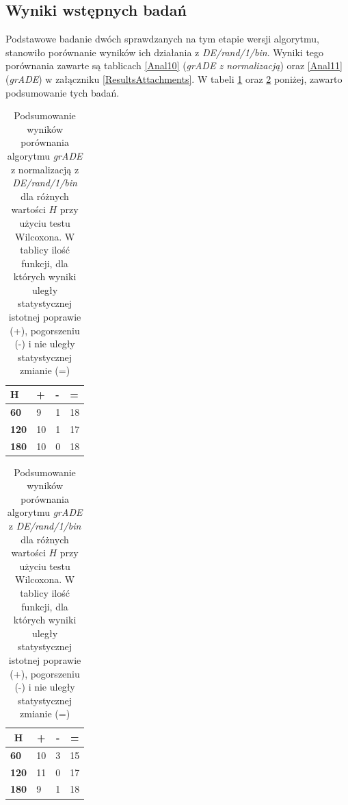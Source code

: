 \documentclass[12pt,a4paper]{report}
\begin{document}
{{{{{{{\subsection{Wyniki wstępnych badań}
\par{
Podstawowe badanie dwóch sprawdzanych na tym etapie wersji algorytmu, stanowiło porównanie wyników ich działania z \emph{DE/rand/1/bin}. Wyniki tego porównania zawarte są tablicach \ref{Anal10} (\emph{grADE z normalizacją}) oraz \ref{Anal11} (\emph{grADE}) w załączniku \ref{ResultsAttachments}. W tabeli \ref{Anal10Sum} oraz \ref{Anal11Sum} poniżej, zawarto podsumowanie tych badań.
}
\begin{table}[h]
\centering
\caption{Podsumowanie wyników porównania algorytmu \emph{grADE} z normalizacją z \emph{DE/rand/1/bin} dla różnych wartości $H$ przy użyciu testu Wilcoxona. W tablicy ilość funkcji, dla których wyniki uległy statystycznej istotnej poprawie (+), pogorszeniu (-) i nie uległy statystycznej zmianie (=)}
\label{Anal10Sum}
\begin{tabular}{|l|l|l|l|}
\hline
{\bf H}   & +  & - & =  \\ \hline
{\bf 60}  & 9  & 1 & 18 \\ \hline
{\bf 120} & 10 & 1 & 17 \\ \hline
{\bf 180} & 10 & 0 & 18 \\ \hline
\end{tabular}
\end{table}

\begin{table}[h]
\centering
\caption{Podsumowanie wyników porównania algorytmu \emph{grADE} z \emph{DE/rand/1/bin} dla różnych wartości $H$ przy użyciu testu Wilcoxona. W tablicy ilość funkcji, dla których wyniki uległy statystycznej istotnej poprawie (+), pogorszeniu (-) i nie uległy statystycznej zmianie (=)}
\label{Anal11Sum}
\begin{tabular}{|l|l|l|l|}
\hline
\multicolumn{1}{|c|}{{\bf H}} & \multicolumn{1}{c|}{{\bf +}} & \multicolumn{1}{c|}{{\bf -}} & \multicolumn{1}{c|}{{\bf =}} \\ \hline
{\bf 60}  & 10 & 3 & 15 \\ \hline
{\bf 120} & 11 & 0 & 17 \\ \hline
{\bf 180} & 9  & 1 & 18 \\ \hline
\end{tabular}
\end{table}

}}}}}}}
\end{document}
